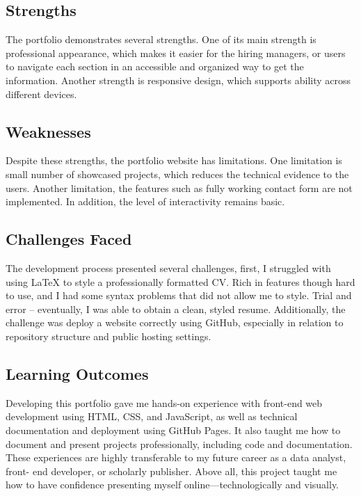 \documentclass[12pt,a4paper]{article}
\begin{document}
\subsection{Strengths}

The portfolio demonstrates several strengths. One of its main strength is professional appearance, which makes it easier for the hiring managers, or users to navigate each section in an accessible and organized way to get the information. Another strength is responsive design, which supports ability across different devices.
\subsection{Weaknesses}

Despite these strengths, the portfolio website has limitations. One limitation is small number of showcased projects, which reduces the technical evidence to the users. Another limitation, the features such as fully working contact form are not implemented. In addition, the level of interactivity remains basic. 

\subsection{Challenges Faced}

The development process presented several challenges, first, I struggled with using LaTeX to style a professionally formatted CV. Rich in features though hard to use, and I had some syntax problems that did not allow me to style. Trial and error – eventually, I was able to obtain a clean, styled resume. Additionally, the challenge was deploy a website correctly using GitHub, especially in relation to repository structure and public hosting settings.


\subsection{Learning Outcomes}

Developing this portfolio gave me hands-on experience with front-end web development using HTML, CSS, and JavaScript, as well as technical documentation and deployment using GitHub Pages. It also taught me how to document and present projects professionally, including code and documentation. These experiences are highly transferable to my future career as a data analyst, front- end developer, or scholarly publisher. Above all, this project taught me how to have confidence presenting myself online—technologically and visually.
\end{document}
